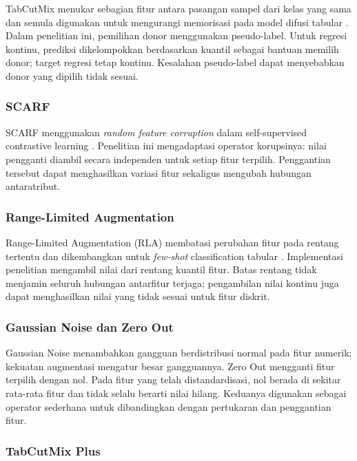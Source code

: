 TabCutMix menukar sebagian fitur antara pasangan sampel dari kelas yang sama dan semula digunakan untuk mengurangi memorisasi pada model difusi tabular \cite{ref12}. Dalam penelitian ini, pemilihan donor menggunakan pseudo-label. Untuk regresi kontinu, prediksi dikelompokkan berdasarkan kuantil sebagai bantuan memilih donor; target regresi tetap kontinu. Kesalahan pseudo-label dapat menyebabkan donor yang dipilih tidak sesuai.

\subsubsection{SCARF}

SCARF menggunakan \textit{random feature corruption} dalam self-supervised contrastive learning \cite{ref7}. Penelitian ini mengadaptasi operator korupsinya: nilai pengganti diambil secara independen untuk setiap fitur terpilih. Penggantian tersebut dapat menghasilkan variasi fitur sekaligus mengubah hubungan antaratribut.

\subsubsection{Range-Limited Augmentation}

Range-Limited Augmentation (RLA) membatasi perubahan fitur pada rentang tertentu dan dikembangkan untuk \textit{few-shot} classification tabular \cite{ref13}. Implementasi penelitian mengambil nilai dari rentang kuantil fitur. Batas rentang tidak menjamin seluruh hubungan antarfitur terjaga; pengambilan nilai kontinu juga dapat menghasilkan nilai yang tidak sesuai untuk fitur diskrit.

\subsubsection{Gaussian Noise dan Zero Out}

Gaussian Noise menambahkan gangguan berdistribusi normal pada fitur numerik; kekuatan augmentasi mengatur besar gangguannya. Zero Out mengganti fitur terpilih dengan nol. Pada fitur yang telah distandardisasi, nol berada di sekitar rata-rata fitur dan tidak selalu berarti nilai hilang. Keduanya digunakan sebagai operator sederhana untuk dibandingkan dengan pertukaran dan penggantian fitur.

\subsubsection{TabCutMix Plus}

